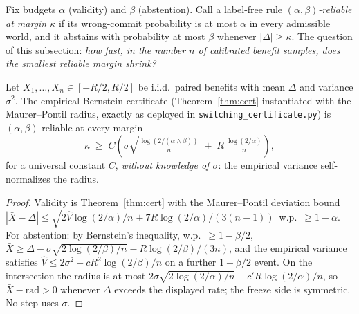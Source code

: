 
Fix budgets $\alpha$ (validity) and $\beta$ (abstention). Call a label-free rule
\emph{$(\alpha,\beta)$-reliable at margin $\kappa$} if its wrong-commit probability is at
most $\alpha$ in every admissible world, and it abstains with probability at most $\beta$
whenever $|\Delta|\ge\kappa$. The question of this subsection: \emph{how fast, in the
number $n$ of calibrated benefit samples, does the smallest reliable margin shrink?}

\begin{proposition}\label{thm:rate-ub}
Let $X_1,\dots,X_n\in[-R/2,R/2]$ be i.i.d.\ paired benefits with mean $\Delta$ and
variance $\sigma^2$. The empirical-Bernstein certificate (Theorem~\ref{thm:cert}
instantiated with the Maurer--Pontil radius, exactly as deployed in
\texttt{switching\_certificate.py}) is $(\alpha,\beta)$-reliable at every margin
\[
\kappa\;\ge\;C\!\left(\sigma\sqrt{\tfrac{\log(2/(\alpha\wedge\beta))}{n}}
\;+\;R\,\tfrac{\log(2/\alpha)}{n}\right),
\]
for a universal constant $C$, \emph{without knowledge of $\sigma$}: the empirical
variance self-normalizes the radius.
\end{proposition}
\begin{proof}
Validity is Theorem~\ref{thm:cert} with the Maurer--Pontil deviation bound
$|\bar X-\Delta|\le\sqrt{2\widehat V\log(2/\alpha)/n}+7R\log(2/\alpha)/(3(n-1))$
\,w.p.\ $\ge1-\alpha$. For abstention: by Bernstein's inequality, w.p.\ $\ge1-\beta/2$,
$\bar X\ge\Delta-\sigma\sqrt{2\log(2/\beta)/n}-R\log(2/\beta)/(3n)$, and the empirical
variance satisfies $\widehat V\le 2\sigma^2+cR^2\log(2/\beta)/n$ on a further
$1-\beta/2$ event. On the intersection the radius is at most
$2\sigma\sqrt{2\log(2/\alpha)/n}+c'R\log(2/\alpha)/n$, so
$\bar X-\mathrm{rad}>0$ whenever $\Delta$ exceeds the displayed rate; the freeze side is
symmetric. No step uses $\sigma$.
\end{proof}

